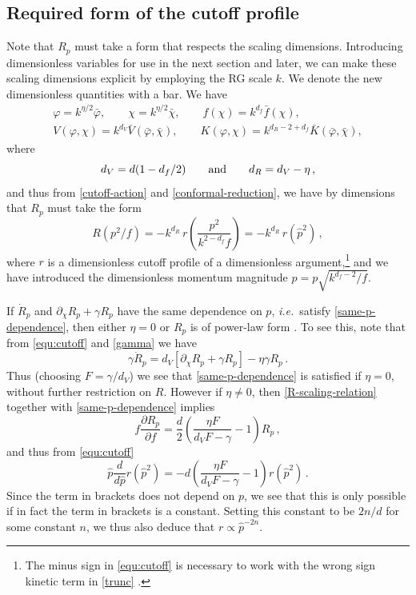 \documentclass[11pt,a4paper]{article}
\numberwithin{figure}{section}
\numberwithin{equation}{section}
\newcommand\ie{\textit{i.e.}\ }
\newcommand{\be}{\begin{equation}}
\newcommand{\ee}{\end{equation}}
\newcommand{\dclnf}{\,\partial_\chi\! \ln\! f \,}
\begin{document}

\subsection{Required form of the cutoff profile}\label{sec:required-cutoff}

Note that $R_p$ must take a form that respects the scaling dimensions. Introducing dimensionless variables for use in the next section and later, we can make these scaling dimensions explicit by employing the RG scale $k$. %
We denote the new dimensionless quantities with a bar. We have
\begin{align}
\label{dim-vars}
	\varphi = k^{\eta/2}\bar\varphi, \qquad\chi = k^{\eta/2}\bar\chi, \qquad f(\chi) = k^{d_f}\bar f(\chi),\nonumber\\
	V(\varphi,\chi) = k^{d_V}\bar V(\bar\varphi,\bar\chi), \qquad K(\varphi, \chi) = k^{d_R- 2 + d_f} \bar  K(\bar\varphi,\bar\chi),
\end{align}
where 
\be 
\label{dimensions}
d_V = d(1-d_f/2)\qquad{\rm and}\qquad d_R = d_V - \eta\,,
\ee 
and thus from \eqref{cutoff-action} and \eqref{conformal-reduction}, we have by dimensions that $R_p$ must take the form
\begin{equation}
\label{equ:cutoff}
	R(p^2/f)= - k^{d_R} \,r\left(\frac{p^2}{k^{2-d_f}f}\right) = - k^{d_R} \,r(\hat p^2) \,,
\end{equation}
where $r$ is a dimensionless cutoff profile of a dimensionless argument,\footnote{The minus sign in \eqref{equ:cutoff} is necessary to work with the wrong sign kinetic term in \eqref{trunc} \cite{Dietz:2015owa}.} and we have introduced the dimensionless momentum magnitude $\hat p = p\sqrt{k^{d_f-2}/f}$. 

If $\dot R_p$ and $\partial_{\chi} R_p + \gamma R_p$ have the same dependence on $p$, \ie satisfy \eqref{same-p-dependence}, then either $\eta=0$ or $R_p$ is of power-law form \cite{Dietz:2015owa}. To see this, note that from \eqref{equ:cutoff} and \eqref{gamma} we have
\be
\label{R-scaling-relation}
\gamma {\dot R}_p = d_V \left[\partial_\chi R_p+\gamma R_p\right] -\eta \gamma R_p\,.
\ee
Thus (choosing $F=\gamma/d_V$) we see that \eqref{same-p-dependence} is satisfied if $\eta=0$, without further restriction on $R$. However if $\eta\ne0$, then \eqref{R-scaling-relation} together with \eqref{same-p-dependence} implies
\be 
f \frac{\partial R_p}{\partial f} = \frac{d}{2}\left( \frac{\eta F}{ d_VF- \gamma} - 1\right) R_p\,,
\ee
and thus from \eqref{equ:cutoff}
\be 
\hat{p} \frac{d}{d\hat{p}} r(\hat{p}^2) = -d\left( \frac{\eta F}{ d_VF- \gamma} - 1\right) r(\hat{p}^2)\,.
\ee
Since the term in brackets does not depend on $p$, we see that this is only possible if in fact the term in brackets is a constant. Setting this constant to be $2n/d$ for some constant $n$, we thus also deduce that $r\propto \hat{p}^{-2n}$.
\end{document}
